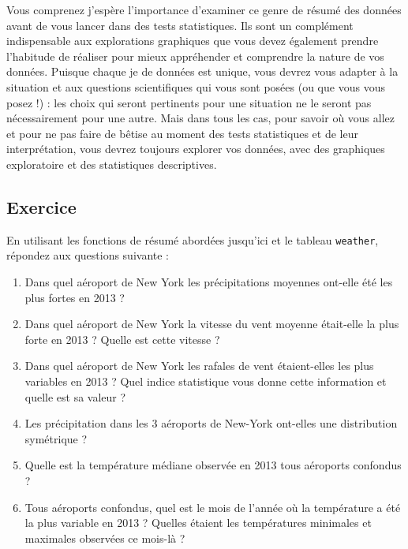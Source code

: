 \documentclass[
  a4paper,
  DIV=11,
  numbers=noendperiod,
  oneside]{scrreprt}
\providecommand{\tightlist}{%
  \setlength{\itemsep}{0pt}\setlength{\parskip}{0pt}}\usepackage{longtable,booktabs,array}
\begin{document}
\begin{tcolorbox}[enhanced jigsaw, colbacktitle=quarto-callout-note-color!10!white, opacityback=0, titlerule=0mm, leftrule=.75mm, bottomtitle=1mm, colframe=quarto-callout-note-color-frame, title=\textcolor{quarto-callout-note-color}{\faInfo}\hspace{0.5em}{Note}, bottomrule=.15mm, opacitybacktitle=0.6, colback=white, rightrule=.15mm, breakable, toptitle=1mm, arc=.35mm, toprule=.15mm, left=2mm, coltitle=black]
Vous comprenez j'espère l'importance d'examiner ce genre de résumé des
données avant de vous lancer dans des tests statistiques. Ils sont un
complément indispensable aux explorations graphiques que vous devez
également prendre l'habitude de réaliser pour mieux appréhender et
comprendre la nature de vos données. Puisque chaque je de données est
unique, vous devrez vous adapter à la situation et aux questions
scientifiques qui vous sont posées (ou que vous vous posez !) : les
choix qui seront pertinents pour une situation ne le seront pas
nécessairement pour une autre. Mais dans tous les cas, pour savoir où
vous allez et pour ne pas faire de bêtise au moment des tests
statistiques et de leur interprétation, vous devrez toujours explorer
vos données, avec des graphiques exploratoire et des statistiques
descriptives.
\end{tcolorbox}

\hypertarget{exercice}{%
\subsection{Exercice}\label{exercice}}

En utilisant les fonctions de résumé abordées jusqu'ici et le tableau
\texttt{weather}, répondez aux questions suivante :

\begin{enumerate}
\def\labelenumi{\arabic{enumi}.}
\tightlist
\item
  Dans quel aéroport de New York les précipitations moyennes ont-elle
  été les plus fortes en 2013 ?
\item
  Dans quel aéroport de New York la vitesse du vent moyenne était-elle
  la plus forte en 2013 ? Quelle est cette vitesse ?
\item
  Dans quel aéroport de New York les rafales de vent étaient-elles les
  plus variables en 2013 ? Quel indice statistique vous donne cette
  information et quelle est sa valeur ?
\item
  Les précipitation dans les 3 aéroports de New-York ont-elles une
  distribution symétrique ?
\item
  Quelle est la température médiane observée en 2013 tous aéroports
  confondus ?
\item
  Tous aéroports confondus, quel est le mois de l'année où la
  température a été la plus variable en 2013 ? Quelles étaient les
  températures minimales et maximales observées ce mois-là ?
\end{enumerate}
\end{document}
